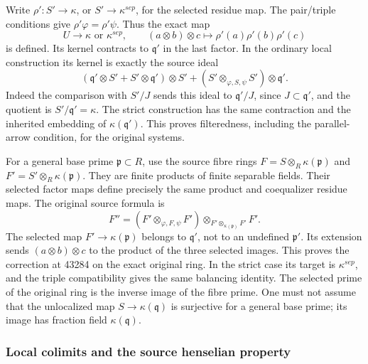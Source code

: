 Write \(\rho':S'\to\kappa\), or \(S'\to\kappa^{sep}\), for the selected residue map. The pair/triple conditions give \(\rho'\varphi=\rho'\psi\). Thus the exact map \[
 U\longrightarrow\kappa\text{ or }\kappa^{sep},\qquad
 (a\otimes b)\otimes c\longmapsto\rho'(a)\rho'(b)\rho'(c)
\] is defined. Its kernel contracts to \(\mathfrak q'\) in the last factor. In the ordinary local construction its kernel is exactly the source ideal \[
 (\mathfrak q'\otimes S'+S'\otimes\mathfrak q')\otimes S'
 +(S'\otimes_{\varphi,S,\psi}S')\otimes\mathfrak q'.
\] Indeed the comparison with \(S'/J\) sends this ideal to \(\mathfrak q'/J\), since \(J\subset\mathfrak q'\), and the quotient is \(S'/\mathfrak q'=\kappa\). The strict construction has the same contraction and the inherited embedding of \(\kappa(\mathfrak q')\). This proves filteredness, including the parallel-arrow condition, for the original systems.

For a general base prime \(\mathfrak p\subset R\), use the source fibre rings \(F=S\otimes_R\kappa(\mathfrak p)\) and \(F'=S'\otimes_R\kappa(\mathfrak p)\). They are finite products of finite separable fields. Their selected factor maps define precisely the same product and coequalizer residue maps. The original source formula is \[
 F''=(F'\otimes_{\varphi,F,\psi}F')
       \otimes_{F'\otimes_{\kappa(\mathfrak p)}F'}F'.
\] The selected map \(F'\to\kappa(\mathfrak p)\) belongs to \(\mathfrak q'\), not to an undefined \(\mathfrak p'\). Its extension sends \((a\otimes b)\otimes c\) to the product of the three selected images. This proves the correction at 43284 on the exact original ring. In the strict case its target is \(\kappa^{sep}\), and the triple compatibility gives the same balancing identity. The selected prime of the original ring is the inverse image of the fibre prime. One must not assume that the unlocalized map \(S\to\kappa(\mathfrak q)\) is surjective for a general base prime; its image has fraction field \(\kappa(\mathfrak q)\).

\subsubsection{Local colimits and the source henselian property}\label{local-colimits-and-the-source-henselian-property}

